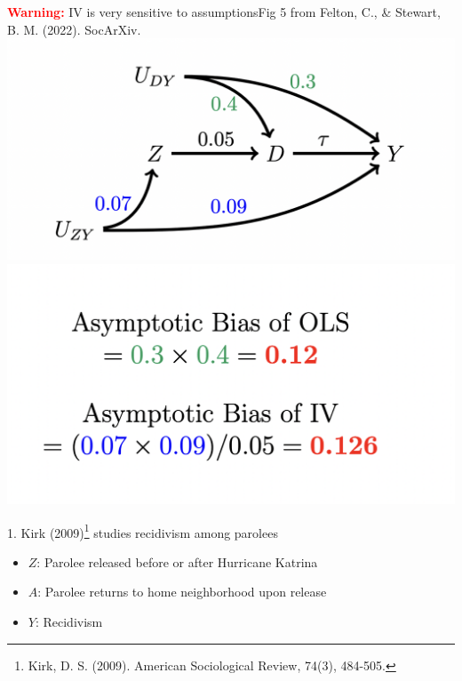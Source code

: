 \documentclass{beamer}
\newcommand\bred[1]{\textcolor{red}{\textbf{#1}}}
\newcommand\bref[2]{\href{#1}{\color{blue}{#2}}}
\begin{document}
\begin{frame}{\bred{Warning:} IV is very sensitive to assumptions}{Fig 5 from Felton, C., \& Stewart, B. M. (2022). \bref{https://doi.org/10.31235/osf.io/3ua7q}{Handle with Care: A Sociologist's Guide to Causal Inference with Instrumental Variables.} SocArXiv.}
\includegraphics[width = .5\textwidth]{figures/fs_fig5a} \pause
\includegraphics[width = .5\textwidth]{figures/fs_fig5b}
\end{frame}


\begin{frame}

1. Kirk (2009)\footnote{Kirk, D. S. (2009). \bref{https://journals.sagepub.com/doi/abs/10.1177/000312240907400308}{A natural experiment on residential change and recidivism: Lessons from Hurricane Katrina.} American Sociological Review, 74(3), 484-505.} studies recidivism among parolees
\begin{itemize}
\item $Z$: Parolee released before or after Hurricane Katrina
\item $A$: Parolee returns to home neighborhood upon release
\item $Y$: Recidivism
\end{itemize}

\end{frame}
\end{document}
